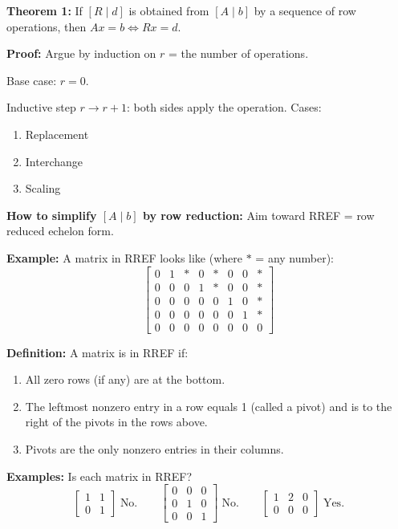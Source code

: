\documentclass{article}
\begin{document}
\newpage

\textbf{Theorem 1:} If $[R \mid d]$ is obtained from $[A \mid b]$ by a sequence of row operations, then $Ax = b \iff Rx = d$.

\medskip

\textbf{Proof:} Argue by induction on $r$ = the number of operations.

\bigskip

Base case: $r = 0$.

\bigskip

Inductive step $r \to r+1$: both sides apply the operation. Cases:
\begin{enumerate}
\item Replacement
\item Interchange
\item Scaling
\end{enumerate}

\newpage

\textbf{How to simplify $[A \mid b]$ by row reduction:} Aim toward RREF = row reduced echelon form.

\medskip

\textbf{Example:} A matrix in RREF looks like (where $*$ = any number):
\[
\begin{bmatrix}
0 & 1 & * & 0 & * & 0 & 0 & * \\
0 & 0 & 0 & 1 & * & 0 & 0 & * \\
0 & 0 & 0 & 0 & 0 & 1 & 0 & * \\
0 & 0 & 0 & 0 & 0 & 0 & 1 & * \\
0 & 0 & 0 & 0 & 0 & 0 & 0 & 0
\end{bmatrix}
\]

\medskip

\textbf{Definition:} A matrix is in RREF if:
\begin{enumerate}
\item All zero rows (if any) are at the bottom.
\item The leftmost nonzero entry in a row equals 1 (called a pivot) and is to the right of the pivots in the rows above.
\item Pivots are the only nonzero entries in their columns.
\end{enumerate}

\medskip

\textbf{Examples:} Is each matrix in RREF?
\[
\begin{bmatrix} 1 & 1 \\ 0 & 1 \end{bmatrix} \; \text{No.} \qquad
\begin{bmatrix} 0 & 0 & 0 \\ 0 & 1 & 0 \\ 0 & 0 & 1 \end{bmatrix} \; \text{No.} \qquad
\begin{bmatrix} 1 & 2 & 0 \\ 0 & 0 & 0 \end{bmatrix} \; \text{Yes.}
\]
\end{document}
